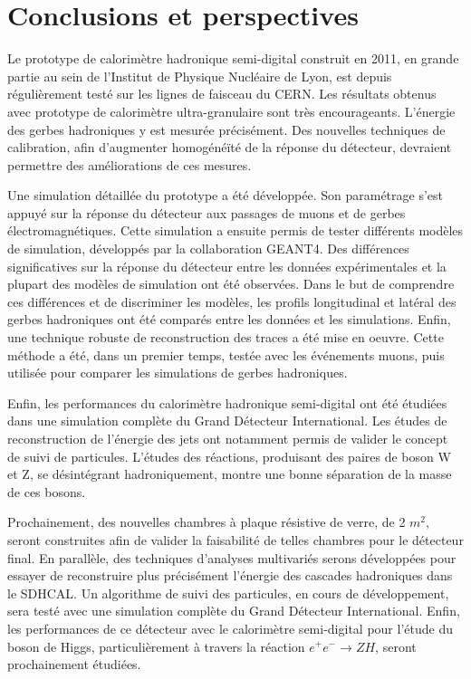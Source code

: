 \chapter*{Conclusions et perspectives}

Le prototype de calorimètre hadronique semi-digital construit en 2011, en grande partie au sein de l'Institut de Physique Nucléaire de Lyon, est depuis régulièrement testé sur les lignes de faisceau du CERN. Les résultats obtenus avec prototype de calorimètre ultra-granulaire sont très encourageants. L'énergie des gerbes hadroniques y est mesurée précisément. Des nouvelles techniques de calibration, afin d'augmenter homogénéïté de la réponse du détecteur, devraient permettre des améliorations de ces mesures. 

Une simulation détaillée du prototype a été développée. Son paramétrage s'est appuyé sur la réponse du détecteur aux passages de muons et de gerbes électromagnétiques. Cette simulation a ensuite permis de tester différents modèles de simulation, développés par la collaboration GEANT4. Des différences significatives sur la réponse du détecteur entre les données expérimentales et la plupart des modèles de simulation ont été observées. Dans le but de comprendre ces différences et de discriminer les modèles, les profils longitudinal et latéral des gerbes hadroniques ont été comparés entre les données et les simulations. Enfin, une technique robuste de reconstruction des traces a été mise en oeuvre. Cette méthode a été, dans un premier temps, testée avec les événements muons, puis utilisée pour comparer les simulations de gerbes hadroniques.

Enfin, les performances du calorimètre hadronique semi-digital ont été étudiées dans une simulation complète du Grand Détecteur International. Les études de reconstruction de l'énergie des jets ont notamment permis de valider le concept de suivi de particules. L'études des réactions, produisant des paires de boson W et Z, se désintégrant hadroniquement, montre une bonne séparation de la masse de ces bosons.

Prochainement, des nouvelles chambres à plaque résistive de verre, de 2 $m^2$, seront construites afin de valider la faisabilité de telles chambres pour le détecteur final. En parallèle, des techniques d'analyses multivariés serons développées pour essayer de reconstruire plus précisément l'énergie des cascades hadroniques dans le SDHCAL. Un algorithme de suivi des particules, en cours de développement, sera testé avec une simulation complète du Grand Détecteur International. Enfin, les performances de ce détecteur avec le calorimètre semi-digital pour l'étude du boson de Higgs, particulièrement à travers la réaction $e^+e^-\rightarrow ZH$, seront prochainement étudiées.

